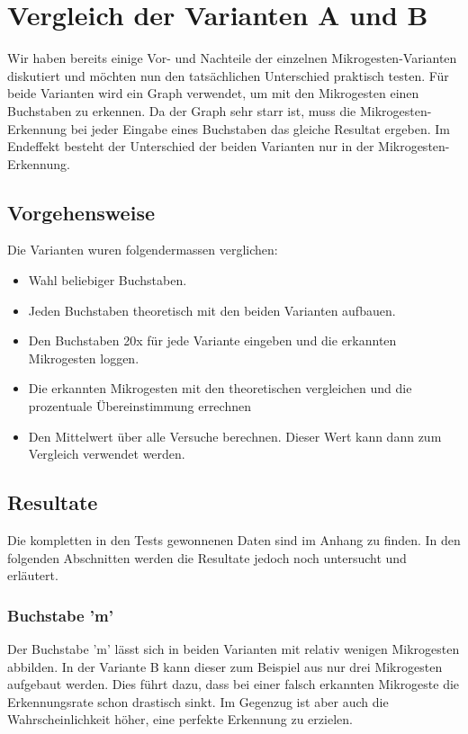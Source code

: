 \chapter{Vergleich der Varianten A und B}
Wir haben bereits einige Vor- und Nachteile der einzelnen Mikrogesten-Varianten diskutiert und möchten nun den tatsächlichen Unterschied praktisch testen. Für beide Varianten wird  ein Graph verwendet, um mit den Mikrogesten einen Buchstaben zu erkennen. Da der Graph sehr starr ist, muss die Mikrogesten-Erkennung bei jeder Eingabe eines Buchstaben das gleiche Resultat ergeben. Im Endeffekt besteht der Unterschied der beiden Varianten nur in der Mikrogesten-Erkennung.

\section{Vorgehensweise}
Die Varianten wuren folgendermassen verglichen:
\begin{itemize}
\item Wahl beliebiger Buchstaben.
\item Jeden Buchstaben theoretisch mit den beiden Varianten aufbauen.
\item Den Buchstaben 20x für jede Variante eingeben und die erkannten Mikrogesten loggen.
\item Die erkannten Mikrogesten mit den theoretischen vergleichen und die prozentuale Übereinstimmung errechnen
\item Den Mittelwert über alle Versuche berechnen. Dieser Wert kann dann zum Vergleich verwendet werden.
\end{itemize}

\section{Resultate}
Die kompletten in den Tests gewonnenen Daten sind im Anhang zu finden. In den folgenden Abschnitten werden die Resultate jedoch noch untersucht und erläutert.

\subsection{Buchstabe 'm'}
Der Buchstabe 'm' lässt sich in beiden Varianten mit relativ wenigen Mikrogesten abbilden. In der Variante B kann dieser zum Beispiel aus nur drei Mikrogesten aufgebaut werden. Dies führt dazu, dass bei einer falsch erkannten Mikrogeste die Erkennungsrate schon drastisch sinkt. Im Gegenzug ist aber auch die Wahrscheinlichkeit höher, eine perfekte Erkennung zu erzielen.


